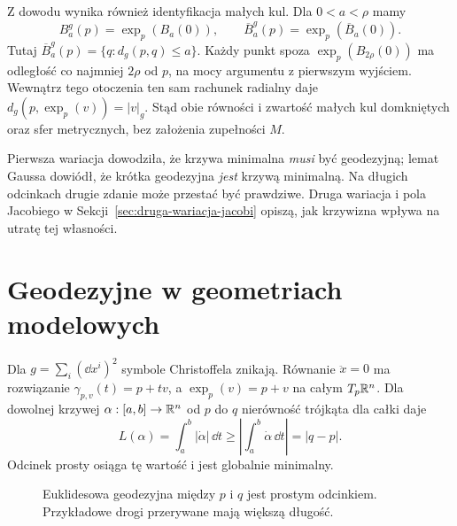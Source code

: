 Z dowodu wynika również identyfikacja małych kul. Dla
$0<a<\rho$ mamy
\begin{equation}\label{eq:male-kule-normalne}
 B^g_a(p)=\exp_p(B_a(0)),\qquad
 \overline B^g_a(p)=\exp_p(\overline B_a(0)).
\end{equation}
Tutaj $\overline B^g_a(p)=\{q:d_g(p,q)\leq a\}$.
Każdy punkt spoza $\exp_p(B_{2\rho}(0))$ ma odległość
co najmniej $2\rho$ od $p$, na mocy argumentu z pierwszym
wyjściem. Wewnątrz tego otoczenia ten sam rachunek
radialny daje $d_g(p,\exp_p(v))=|v|_g$.
Stąd obie równości i zwartość małych kul domkniętych
oraz sfer metrycznych, bez założenia zupełności $M$.

Pierwsza wariacja dowodziła, że krzywa minimalna
\emph{musi} być geodezyjną; lemat Gaussa dowiódł,
że krótka geodezyjna \emph{jest} krzywą minimalną.
Na długich odcinkach drugie zdanie może
przestać być prawdziwe. Druga wariacja i pola
Jacobiego w Sekcji~\ref{sec:druga-wariacja-jacobi}
opiszą, jak krzywizna wpływa na utratę tej własności.

\section{Geodezyjne w geometriach modelowych}
\label{sec:geodezyjne-modele}

\begin{przyklad}
\label{prz:geodezyjne-euklidesowe}
Dla $g=\sum_i(\dd x^i)^2$ symbole Christoffela
znikają. Równanie $\ddot x=0$ ma rozwiązanie
$\gamma_{p,v}(t)=p+tv$, a $\exp_p(v)=p+v$
na całym $T_p\mathbb{R}^n$. Dla dowolnej krzywej
$\alpha:[a,b]\to\mathbb{R}^n$ od $p$ do $q$
nierówność trójkąta dla całki daje
\[
 L(\alpha)=\int_a^b|\dot\alpha|\,\dd t
 \geq\left|\int_a^b\dot\alpha\,\dd t\right|
 =|q-p|.
\]
Odcinek prosty osiąga tę wartość i jest
globalnie minimalny.
\end{przyklad}

\begin{figure}[htbp]
\centering
{}
\caption{Euklidesowa geodezyjna między $p$ i $q$ jest prostym odcinkiem. Przykładowe drogi przerywane mają większą długość.}
\label{fig:geodezyjna-euklidesowa}
\end{figure}

